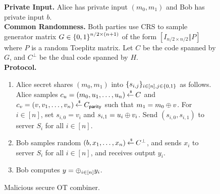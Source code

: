 \begin{figure}[!h]
\begin{boxedalgo}
{\bfseries Private Input.} Alice has private input $(m_0,m_1)$ and Bob has private input $b$.\\

{\bfseries Common Randomness.} Both parties use CRS to sample generator matrix $G \in {\{0,1\}}^{n/2 \times (n+1)}$ of the form $[I_{n/2\times n/2}\Vert P]$ where $P$ is a random Toeplitz matrix.
Let $C$ be the code spanned by $G$, and $C^\perp$ be the dual code spanned by $H$.\\

{\bfseries Protocol.}
\begin{enumerate}
	\item Alice secret shares $(m_0, m_1)$ into $\{s_{i,j}\}_{i \in [n],j \in {\{0,1\}}}$ as follows.
	Alice samples $c_u = (m_0,u_1,\dotsc, u_n) \mathbin{\stackrel{\mbox{\,\tiny \$}}{\gets}} C$ and $c_v = (v, v_1, \dotsc, v_n) \mathbin{\stackrel{\mbox{\,\tiny \$}}{\gets}} C_\mathsf{parity}$ such that $m_1 = m_0 \oplus v$.
	For $ i\in [n]$, set $s_{i,0} = v_i$ and $s_{i,1} = u_i \oplus v_i$.
	Send $(s_{i,0}, s_{i,1})$ to server $S_i$ for all $i \in[n]$.
	
	\item Bob samples random $(b, x_1,\dotsc, x_n) \mathbin{\stackrel{\mbox{\,\tiny \$}}{\gets}} C^\perp$, and sends $x_i$ to server $S_i$ for all $i \in [n]$, and receives output $y_i$.
	
	\item Bob computes $y = \oplus_{i \in [n]} y_i$.
\end{enumerate}
	
\end{boxedalgo}
\label{fig:combiner}
\caption{Malicious secure OT combiner.}
\end{figure}